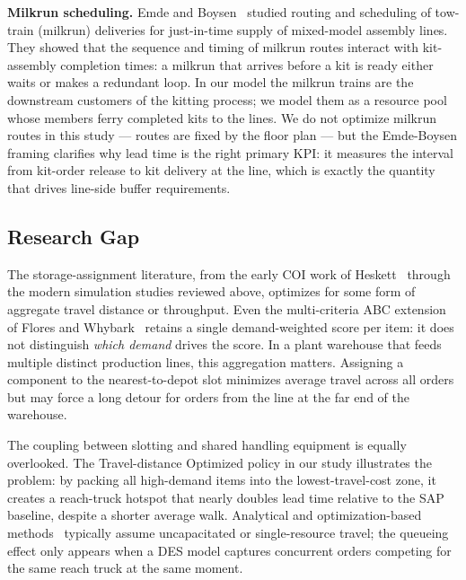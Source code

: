 \medskip
\noindent\textbf{Milkrun scheduling.}
Emde and Boysen~\cite{emde2012} studied routing and scheduling of tow-train
(milkrun) deliveries for just-in-time supply of mixed-model assembly lines.
They showed that the sequence and timing of milkrun routes interact with
kit-assembly completion times: a milkrun that arrives before a kit is ready
either waits or makes a redundant loop.
In our model the milkrun trains are the downstream customers of the kitting
process; we model them as a resource pool whose members ferry completed kits
to the lines.
We do not optimize milkrun routes in this study — routes are fixed by the
floor plan — but the Emde-Boysen framing clarifies why lead time is the
right primary KPI: it measures the interval from kit-order release to kit
delivery at the line, which is exactly the quantity that drives line-side
buffer requirements.

\subsection{Research Gap}\label{subsec:gap}

The storage-assignment literature, from the early COI work of
Heskett~\cite{heskett1963} through the modern simulation studies reviewed
above, optimizes for some form of aggregate travel distance or throughput.
Even the multi-criteria ABC extension of Flores and
Whybark~\cite{flores1986} retains a single demand-weighted score per item:
it does not distinguish \emph{which demand} drives the score.
In a plant warehouse that feeds multiple distinct production lines, this
aggregation matters.
Assigning a component to the nearest-to-depot slot minimizes average travel
across all orders but may force a long detour for orders from the line at
the far end of the warehouse.

The coupling between slotting and shared handling equipment is equally
overlooked.
The Travel-distance Optimized policy in our study illustrates the problem:
by packing all high-demand items into the lowest-travel-cost zone, it
creates a reach-truck hotspot that nearly doubles lead time relative to the
SAP baseline, despite a shorter average walk.
Analytical and optimization-based methods~\cite{moghadam2025,kokroko2025}
typically assume uncapacitated or single-resource travel; the queueing
effect only appears when a DES model captures concurrent orders competing
for the same reach truck at the same moment.

